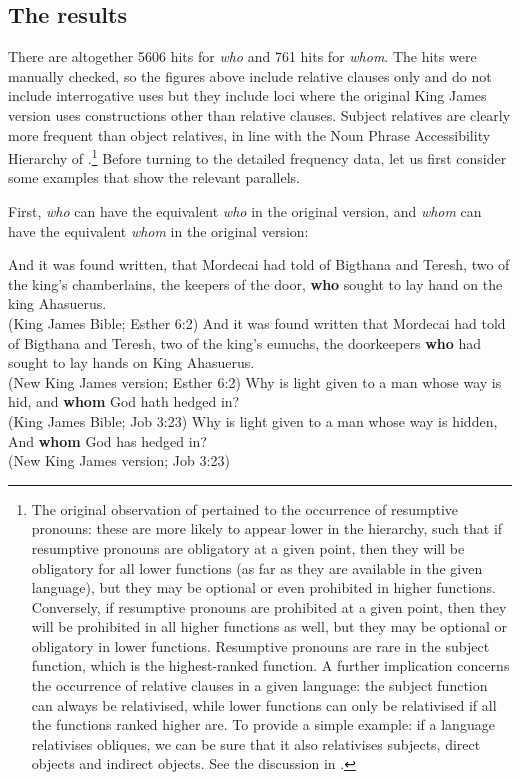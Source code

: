\subsection{The results} \label{sec:4results}
There are altogether 5606 hits for \textit{who} and 761 hits for \textit{whom}. The hits were manually checked, so the figures above include relative clauses only and do not include interrogative uses but they include loci where the original King James version uses constructions other than relative clauses. Subject relatives are clearly more frequent than object relatives, in line with the Noun Phrase Accessibility Hierarchy of \citet[66--67]{keenancomrie1977}.\footnote{The original observation of \citet{keenancomrie1977} pertained to the occurrence of resumptive pronouns: these are more likely to appear lower in the hierarchy, such that if resumptive pronouns are obligatory at a given point, then they will be obligatory for all lower functions (as far as they are available in the given language), but they may be optional or even prohibited in higher functions. Conversely, if resumptive pronouns are prohibited at a given point, then they will be prohibited in all higher functions as well, but they may be optional or obligatory in lower functions. Resumptive pronouns are rare in the subject function, which is the highest-ranked function. A further implication concerns the occurrence of relative clauses in a given language: the subject function can always be relativised, while lower functions can only be relativised if all the functions ranked higher are. To provide a simple example: if a language relativises obliques, we can be sure that it also relativises subjects, direct objects and indirect objects. See the discussion in \citet[105--107]{bacskaiatkari2020nordlyd}.} Before turning to the detailed frequency data, let us first consider some examples that show the relevant parallels.

First, \textit{who} can have the equivalent \textit{who} in the original version, and \textit{whom} can have the equivalent \textit{whom} in the original version:

\ea
\ea And it was found written, that Mordecai had told of Bigthana and Teresh, two of the king's chamberlains, the keepers of the door, \textbf{who} sought to lay hand on the king Ahasuerus.\\
(King James Bible; Esther 6:2)
\ex And it was found written that Mordecai had told of Bigthana and Teresh, two of the king's eunuchs, the doorkeepers \textbf{who} had sought to lay hands on King Ahasuerus.\\
(New King James version; Esther 6:2)
\ex Why is light given to a man whose way is hid, and \textbf{whom} God hath hedged in?\\
(King James Bible; Job 3:23)
\ex Why is light given to a man whose way is hidden, And \textbf{whom} God has hedged in?\\
(New King James version; Job 3:23)
\z
\z

